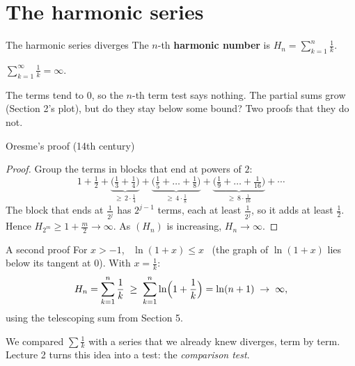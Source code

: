 \documentclass{wosm-slides}
\begin{document}
\section{The harmonic series}

\begin{frame}{The harmonic series diverges}
  The $n$-th \textbf{harmonic number} is $H_n = \sum_{k=1}^{n} \frac1k$.
  \begin{theorem}
    $\displaystyle\sum_{k=1}^\infty \frac1k = \infty$.
  \end{theorem}
  The terms tend to $0$, so the $n$-th term test says nothing. The partial sums grow
  (Section 2's plot), but do they stay below some bound?
  Two proofs that they do not.
\end{frame}

\begin{frame}{Oresme's proof (14th century)}
  \begin{proof}
    Group the terms in blocks that end at powers of $2$:
    \[ 1 + \tfrac12 + \underbrace{\bigl(\tfrac13 + \tfrac14\bigr)}_{\ge\, 2 \cdot \frac14}
         + \underbrace{\bigl(\tfrac15 + \dots + \tfrac18\bigr)}_{\ge\, 4 \cdot \frac18}
         + \underbrace{\bigl(\tfrac19 + \dots + \tfrac1{16}\bigr)}_{\ge\, 8 \cdot \frac1{16}}
         + \cdots \]
    The block that ends at $\frac{1}{2^j}$ has $2^{j-1}$ terms, each at least $\frac1{2^j}$,
    so it adds at least $\frac12$. Hence $H_{2^m} \ge 1 + \frac m2 \to \infty$.
    As $(H_n)$ is increasing, $H_n \to \infty$.
  \end{proof}
\end{frame}

\begin{frame}{A second proof}
  For $x > -1$, \ $\ln(1 + x) \le x$ \ (the graph of $\ln(1+x)$ lies below its tangent at $0$).
  \pause
  With $x = \frac1k$:
  \[ H_n = \sum_{k=1}^{n} \frac1k \;\ge\; \sum_{k=1}^{n} \ln\Bigl(1 + \frac1k\Bigr)
       = \ln(n+1) \;\to\; \infty , \]
  using the telescoping sum from Section 5.
  \pause
  \begin{remark}
    We compared $\sum \frac1k$ with a series that we already knew diverges, term by term.
    Lecture 2 turns this idea into a test: the \emph{comparison test}.
  \end{remark}
\end{frame}
\end{document}
